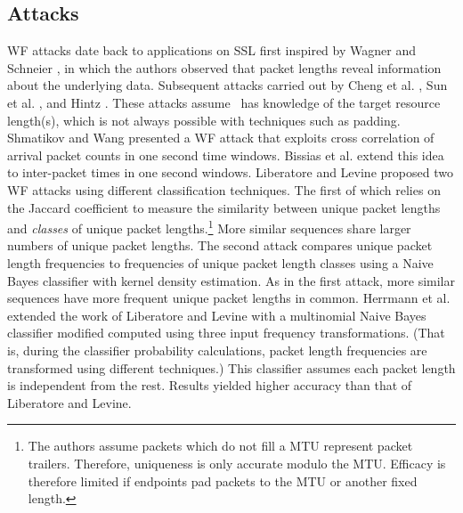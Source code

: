 \documentclass[runningheads]{llncs}
\begin{document}
\subsection{Attacks}
WF attacks date back to applications on SSL first inspired by Wagner and 
Schneier \cite{wagner1996analysis}, in which the authors observed that 
packet lengths reveal information about the underlying data. Subsequent attacks
carried out by Cheng et al. \cite{cheng1998traffic}, 
Sun et al. \cite{sun2002statistical}, and Hintz \cite{hintz2002fingerprinting}. 
These attacks assume \adv\ has knowledge of the target resource length(s), 
which is not always possible with techniques such as padding. Shmatikov and Wang \cite{shmatikov2006timing} 
presented a WF attack that exploits cross correlation of arrival packet counts in
one second time windows. Bissias et al. \cite{bissias2005privacy} extend this idea to inter-packet
times in one second windows. Liberatore and Levine \cite{liberatore2006inferring} proposed two WF attacks
using different classification techniques. The first of which relies on the Jaccard 
coefficient to measure the similarity between unique packet lengths and \emph{classes}
of unique packet lengths.\footnote{The authors assume packets which do not fill a MTU
represent packet trailers. Therefore, uniqueness is only accurate modulo the MTU. Efficacy
is therefore limited if endpoints pad packets to the MTU or another fixed length.}
More similar sequences share larger numbers of unique packet lengths. The second 
attack compares unique packet length frequencies to frequencies of unique packet length
classes using a Naive Bayes classifier with kernel density estimation. As in the first 
attack, more similar sequences have more frequent unique packet lengths in common. 
Herrmann et al. \cite{herrmann2009website} extended the work of Liberatore and Levine with a multinomial
Naive Bayes classifier modified computed using three input frequency transformations. 
(That is, during the classifier probability calculations, packet length frequencies are 
transformed using different techniques.) This classifier assumes each packet length is 
independent from the rest. Results yielded higher accuracy than that of Liberatore and Levine.
\end{document}
